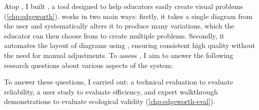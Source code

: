 Atop \Penrose, I built \Edgeworth, a tool designed to help educators easily create visual problems (\cref{chp:edgeworth}). \Edgeworth works in two main ways: firstly, it takes a single diagram from the user and systematically alters it to produce many variations, which the educator can then choose from to create multiple problems. Secondly, it automates the layout of diagrams using \Penrose, ensuring consistent high quality without the need for manual adjustments. To assess \Edgeworth, I aim to answer the following research questions about various aspects of the system:


To answer these questions, I carried out: a technical evaluation to evaluate reliability, a user study to evaluate efficiency, and expert walkthrough demonstrations to evaluate ecological validity (\cref{chp:edgeworth-eval}). 






